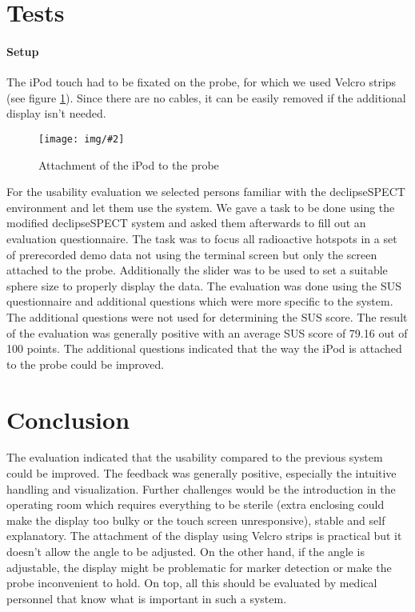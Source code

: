 \documentclass{scrartcl}
\newcommand{\graphic}[3][width=\linewidth] %
{
  \begin{figure}[h!t]
    \centering
    \texttt{[image: img/\#2]}
    \caption{#3}
    \label{fig:#2}
  \end{figure}
}
\newcommand{\refFigure}[1]{figure \ref{fig:#1}}
\begin{document}
\section{Tests}
\paragraph*{Setup}
The iPod touch had to be fixated on the probe, for which we used Velcro strips (see \refFigure{probe}). Since there are no cables, it can be easily removed if the additional display isn't needed.
\graphic[scale=.5]{probe}{Attachment of the iPod to the probe}

For the usability evaluation we selected persons familiar with the declipseSPECT environment and let them use the system. We gave a task to be done using the modified declipseSPECT system and asked them afterwards to fill out an evaluation questionnaire.
The task was to focus all radioactive hotspots in a set of prerecorded demo data not using the terminal screen but only the screen attached to the probe. Additionally the slider was to be used to set a suitable sphere size to properly display the data. The evaluation was done using the SUS \cite{sus} questionnaire and additional questions which were more specific to the system. The additional questions were not used for determining the SUS score.
The result of the evaluation was generally positive with an average SUS score of 79.16 out of 100 points. The additional questions indicated that the way the iPod is attached to the probe could be improved.



\section{Conclusion}
The evaluation indicated that the usability compared to the previous system could be improved. The feedback was generally positive, especially the intuitive handling and visualization.
Further challenges would be the introduction in the operating room which requires everything to be sterile (extra enclosing could make the display too bulky or the touch screen unresponsive), stable and self explanatory.
The attachment of the display using Velcro strips is practical but it doesn't allow the angle to be adjusted. On the other hand, if the angle is adjustable, the display might be problematic for marker detection or make the probe inconvenient to hold.
On top, all this should be evaluated by medical personnel that know what is important in such a system.




\end{document}
